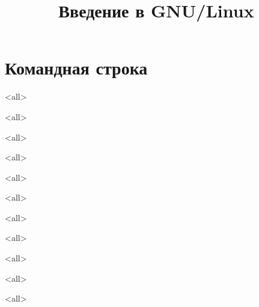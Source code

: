 

\title{Введение в GNU/Linux}





\frame{
	\frametitle{}
	\titlepage
	\vspace{-0.5cm}
	\begin{center}
	\end{center}
}
\frame{
	\tableofcontents
}

\section{Командная строка}

\mode<all>{}

\mode<all>{}

\mode<all>{}

\mode<all>{}

\mode<all>{}

\mode<all>{}

\mode<all>{}

\mode<all>{}

\mode<all>{}

\mode<all>{}

\mode<all>{}


